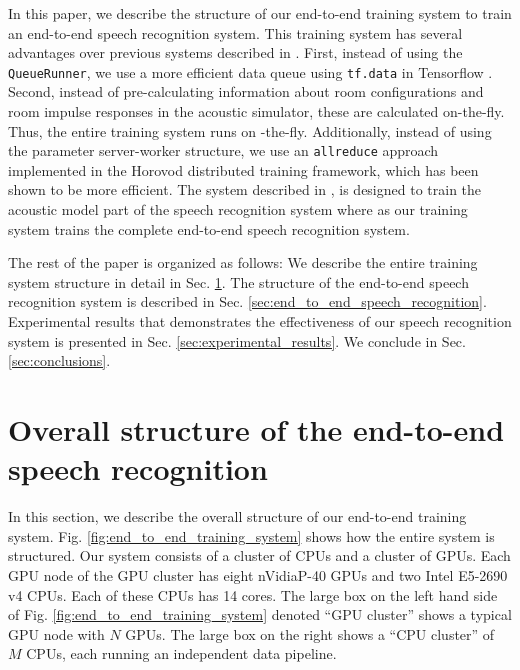 \documentclass[a4paper]{article}
\begin{document}
%
%
\begin{figure*}[!tbp]
  \begin{center}
    \resizebox{\textwidth}{!}{}
      \caption { The Samsung Research end-to-end training framework for building an end-to-end
	speech recognition system with multi CPU-GPU clusters and on-the-fly data
	processing and augmentation pipeline.
     }   
     \label{fig:end_to_end_training_system}
  \end{center}
\vspace{-5mm}
\end{figure*}
%
%

In this paper, we describe the structure of our end-to-end training system
to train an end-to-end speech recognition system. This training system
has several advantages over previous systems described in
\cite{c_kim_interspeech_2018_00}. First, instead of using the {\tt QueueRunner},
we use a more efficient data queue using {\tt tf.data} in Tensorflow 
\cite{m_abadi_usenix_2016}.  Second, instead
of pre-calculating information about room configurations and 
room impulse responses in the acoustic simulator, these are
calculated on-the-fly. Thus, the entire training system runs on
-the-fly. Additionally, instead of using the parameter server-worker
structure, we use an {\tt allreduce} approach implemented in the Horovod
\cite{a_sergeev_arxiv_2018_00} distributed training framework, which
has been shown to be more efficient. The system described in 
\cite{E_Variani_INTERSPEECH_2017_01}, is designed
to train the acoustic model part of the speech recognition system where
as our training system trains the complete end-to-end speech recognition system.

The rest of the paper is organized as follows: We describe the entire
training system structure in detail in Sec. \ref{sec:training_cpu_gpu}.
The structure of the end-to-end speech recognition system 
is described in Sec. \ref{sec:end_to_end_speech_recognition}. 
Experimental results that demonstrates the effectiveness of our speech
recognition system is presented in Sec. \ref{sec:experimental_results}. 
We conclude in Sec.  \ref{sec:conclusions}.
%
\section{Overall structure of the end-to-end speech recognition}
\label{sec:training_cpu_gpu}
\vspace{-1mm}

In this section, we describe the overall structure of our 
end-to-end training system.  Fig. \ref{fig:end_to_end_training_system}
shows how the entire system is structured. Our system consists
of a cluster of CPUs and a cluster of GPUs. Each GPU node of 
the GPU cluster has eight nVidia\texttrademark P-40 GPUs and two 
Intel E5-2690 v4 CPUs. Each of these CPUs has 14 cores.
The large box on the left hand side of Fig. \ref{fig:end_to_end_training_system}
denoted ``GPU cluster'' shows a typical GPU node with $N$ GPUs.
The large box on the right shows a ``CPU cluster'' of $M$ CPUs,
each running an independent data pipeline. 
\end{document}
